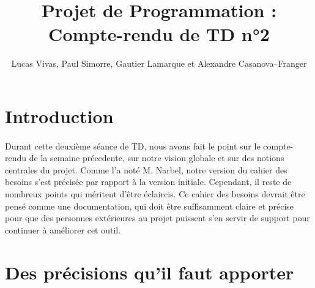 \documentclass[a4paper]{article}
\title{Projet de Programmation : Compte-rendu de TD n°2}
\author{Lucas Vivas, Paul Simorre, Gautier Lamarque et Alexandre Casanova--Franger}
\begin{document}
\maketitle

\section*{Introduction}

\paragraph{}
Durant cette deuxième séance de TD, nous avons fait le point sur le compte-rendu de la semaine précedente, sur notre vision globale et sur des notions centrales du projet. Comme l'a noté M. Narbel, notre version du cahier des besoins s'est précisée par rapport à la version initiale. Cependant, il reste de nombreux points qui méritent d'être éclaircis.
Ce cahier des besoins devrait être pensé comme une documentation, qui doit être suffisamment claire et précise pour que des personnes extérieures au projet puissent s'en servir de support pour continuer à améliorer cet outil.

\section*{Des précisions qu'il faut apporter}
\end{document}
